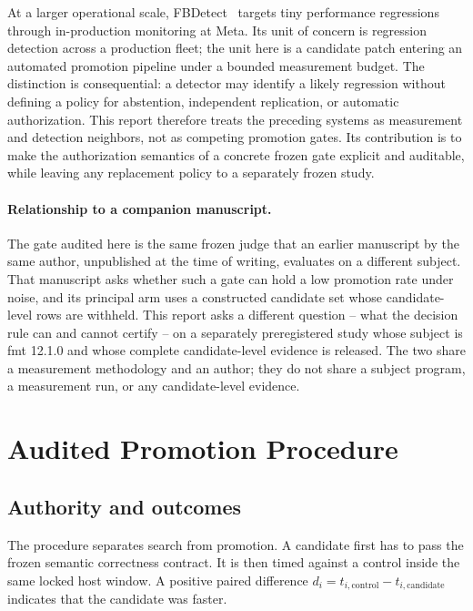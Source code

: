 \documentclass[10pt]{article}
\begin{document}
At a larger operational scale, FBDetect~\citep{yoon2024fbdetect} targets tiny
performance regressions through in-production monitoring at Meta.  Its unit of
concern is regression detection across a production fleet; the unit here is a
candidate patch entering an automated promotion pipeline under a bounded
measurement budget.  The distinction is consequential: a detector may identify
a likely regression without defining a policy for abstention, independent
replication, or automatic authorization.  This report therefore treats the
preceding systems as measurement and detection neighbors, not as competing
promotion gates.  Its contribution is to make the authorization semantics of a
concrete frozen gate explicit and auditable, while leaving any replacement
policy to a separately frozen study.

\paragraph{Relationship to a companion manuscript.}
The gate audited here is the same frozen 
judge that an earlier manuscript by the same author, unpublished at the time of
writing, evaluates on a different subject.  That manuscript asks whether such a
gate can hold a low promotion rate under noise, and its principal arm uses a
constructed candidate set whose candidate-level rows are withheld.  This report
asks a different question -- what the decision rule can and cannot certify --
on a separately preregistered study whose subject is fmt 12.1.0 and whose
complete candidate-level evidence is released.  The two share a measurement
methodology and an author; they do not share a subject program, a measurement
run, or any candidate-level evidence.

\section{Audited Promotion Procedure}

\subsection{Authority and outcomes}

The procedure separates search from promotion.  A candidate first has to pass
the frozen semantic correctness contract.  It is then timed against a control
inside the same locked host window.  A positive paired difference
$d_i=t_{i,\mathrm{control}}-t_{i,\mathrm{candidate}}$ indicates that the
candidate was faster.
\end{document}
